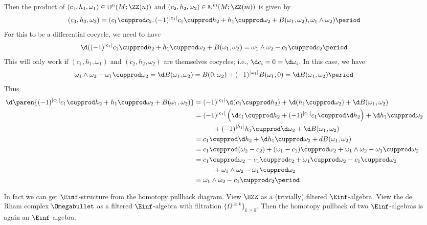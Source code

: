 \begin{nul}
	Then the product of $(c_1,h_1,\omega_1)\in \Cup^n(M;\ZZ(n))$ and $(c_2,h_2,\omega_2)\in \Cup^m(M;\ZZ(m))$ is given by
	\[
		(c_3,h_3,\omega_3)=(c_1\cupprod c_2,(-1)^{|c_1|}c_1\cupprod h_2+h_1\cupprod\omega_2+B(\omega_1,\omega_2),\omega_1\wedge\omega_2) \period 
	\]
	For this to be a differential cocycle, we need to have 
	\[
		\d((-1)^{|c_1|}c_1\cupprod h_2+h_1\cupprod \omega_2+B(\omega_1,\omega_2)=\omega_1\wedge\omega_2-c_1\cupprod c_2 \period 
		\]
	This will only work if $(c_1,h_1,\omega_1)$ and $(c_2,h_2,\omega_2)$ are themselves cocycles; i.e., $\d c_i=0=\d\omega_i$. 
	In this case, we have
	\[
		\omega_1\wedge\omega_2-\omega_1\cupprod\omega_2=\d B(\omega_1,\omega_2)=B(0,\omega_2)+(-1)^{|\omega_1|}B(\omega_1,0)=\d B(\omega_1,\omega_2) \period
	\]
	Thus
	\begin{align*}
		\d\paren{(-1)^{|c_1|}c_1\cupprod h_2+h_1\cupprod \omega_2+B(\omega_1,\omega_2)} &= (-1)^{|c_1|}\d(c_1\cupprod h_2)+\d(h_1\cupprod\omega_2)+\d B(\omega_1,\omega_2) \\
		&=(-1)^{|c_1|}\left(\d c_1\cupprod h_2+(-1)^{|c_1|}c_1\cupprod \d h_2\right)+\d h_1\cupprod\omega_2 \\ 
		&\phantom{=} \qquad +(-1)^{|h_1|}h_1\cupprod \d\omega_2+\d B(\omega_1,\omega_2) \\
		&= c_1\cupprod \d h_2+\d h_1\cupprod\omega_2+dB(\omega_1,\omega_2) \\
		&= c_1\cupprod(\omega_2-c_2)+(\omega_1-c_1)\cupprod\omega_2+\omega_1\wedge\omega_2-\omega_1\cupprod\omega_2 \\
		&= c_1\cupprod\omega_2-c_1\cupprod c_2+\omega_1\cupprod\omega_2-c_1\cupprod\omega_2 \\ 
		&\phantom{=} \qquad +\omega_1\wedge\omega_2-\omega_1\cupprod\omega_2 \\ 
		&=\omega_1\wedge\omega_2-c_1\cupprod c_2 \period
	\end{align*}
\end{nul}

\begin{remark}
	In fact we can get $\Einf$-structure from the homotopy pullback diagram.
	View $\HZZ$ as a (trivially) filtered $\Einf$-algebra. 
	View the de Rham complex $ \Omegabullet$ as a filtered $\Einf$-algebra with filtration $ \{\Omega^{\geq k}\}_{k \geq 0} $. 
	Then the homotopy pullback of two $\Einf$-algebras is again an $\Einf$-algebra.
\end{remark}

